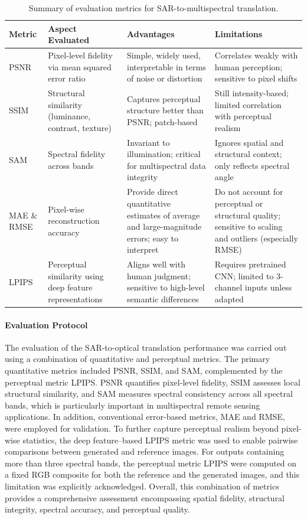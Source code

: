 \renewcommand{\arraystretch}{1.25} %
\begin{table}[h!]
	\centering
	\caption[Evaluation metrics used summary]{Summary of evaluation metrics for SAR-to-multispectral translation.}
	\begin{tabularx}{\textwidth}{p{1.7cm}X X X}
		\toprule
		\textbf{Metric} & \textbf{Aspect Evaluated} & \textbf{Advantages} & \textbf{Limitations} \\
		\midrule
		PSNR  & Pixel-level fidelity via mean squared error ratio & Simple, widely used, interpretable in terms of noise or distortion & Correlates weakly with human perception; sensitive to pixel shifts \\
		SSIM  & Structural similarity (luminance, contrast, texture) & Captures perceptual structure better than PSNR; patch-based & Still intensity-based; limited correlation with perceptual realism \\
		SAM   & Spectral fidelity across bands & Invariant to illumination; critical for multispectral data integrity & Ignores spatial and structural context; only reflects spectral angle \\
		MAE \& RMSE & Pixel-wise reconstruction accuracy & Provide direct quantitative estimates of average and large-magnitude errors; easy to interpret & Do not account for perceptual or structural quality; sensitive to scaling and outliers (especially RMSE) \\
		LPIPS & Perceptual similarity using deep feature representations & Aligns well with human judgment; sensitive to high-level semantic differences & Requires pretrained CNN; limited to 3-channel inputs unless adapted \\
		\bottomrule
	\end{tabularx}
\end{table}
\renewcommand{\arraystretch}{1.0} %



\paragraph{Evaluation Protocol} 
The evaluation of the SAR-to-optical translation performance was carried out using a combination of quantitative and perceptual metrics. The primary quantitative metrics included PSNR, SSIM, and SAM, complemented by the perceptual metric LPIPS. PSNR quantifies pixel-level fidelity, SSIM assesses local structural similarity, and SAM measures spectral consistency across all spectral bands, which is particularly important in multispectral remote sensing applications. In addition, conventional error-based metrics, MAE and RMSE, were employed for validation. To further capture perceptual realism beyond pixel-wise statistics, the deep feature–based LPIPS metric was used to enable pairwise comparisons between generated and reference images. For outputs containing more than three spectral bands, the perceptual metric LPIPS were computed on a fixed RGB composite for both the reference and the generated images, and this limitation was explicitly acknowledged. Overall, this combination of metrics provides a comprehensive assessment encompassing spatial fidelity, structural integrity, spectral accuracy, and perceptual quality.
